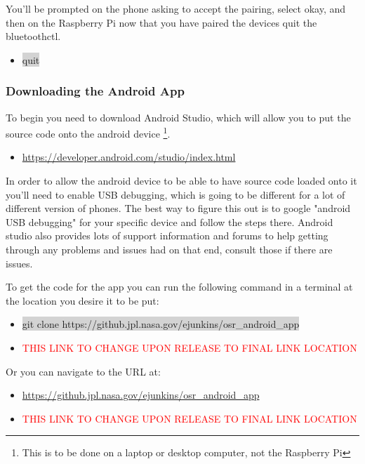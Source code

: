 \documentclass[12pt]{article}
\begin{document}
\noindent You'll be prompted on the phone asking to accept the pairing, select okay, and then on the Raspberry Pi now that you have paired the devices quit the bluetoothctl.
\begin{itemize}
	\item[] \colorbox{lightgray}{quit} 
\end{itemize}

\subsubsection{Downloading the Android App}

To begin you need to download Android Studio, which will allow you to put the source code onto the android device \footnote{This is to be done on a laptop or desktop computer, not the Raspberry Pi}.

\begin{itemize}
	\item \href{https://developer.android.com/studio/index.html}{https://developer.android.com/studio/index.html}
\end{itemize}

\noindent In order to allow the android device to be able to have source code loaded onto it you'll need to enable USB debugging, which is going to be different for a lot of different version of phones. The best way to figure this out is to google "android USB debugging" for your specific device and follow the steps there. Android studio also provides lots of support information and forums to help getting through any problems and issues had on that end, consult those if there are issues.

\bigskip

\noindent To get the code for the app you can run the following command in a terminal at the location you desire it to be put:

\begin{itemize}
	\item[] \colorbox{lightgray}{git clone https://github.jpl.nasa.gov/ejunkins/osr\_android\_app}
	\item[] \textcolor{red}{THIS LINK TO CHANGE UPON RELEASE TO FINAL LINK LOCATION}
\end{itemize}

\noindent Or you can navigate to the URL at:

\begin{itemize}
	\item[] \href{https://github.jpl.nasa.gov/ejunkins/osr_android_app}{https://github.jpl.nasa.gov/ejunkins/osr\_android\_app}
	\item[] \textcolor{red}{THIS LINK TO CHANGE UPON RELEASE TO FINAL LINK LOCATION}
\end{itemize}
\end{document}
